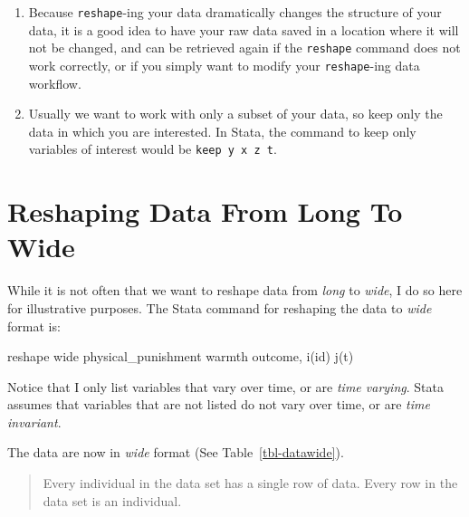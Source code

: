 \documentclass[
  letterpaper,
  DIV=11,
  numbers=noendperiod]{scrreprt}
\newenvironment{Shaded}{\begin{snugshade}}{\end{snugshade}}
\newcommand{\KeywordTok}[1]{\textcolor[rgb]{0.00,0.23,0.31}{#1}}
\newcommand{\NormalTok}[1]{\textcolor[rgb]{0.00,0.23,0.31}{#1}}
\providecommand{\tightlist}{%
  \setlength{\itemsep}{0pt}\setlength{\parskip}{0pt}}\usepackage{longtable,booktabs,array}
\begin{document}
\begin{enumerate}
\def\labelenumi{\arabic{enumi}.}
\tightlist
\item
  Because \texttt{reshape}-ing your data dramatically changes the
  structure of your data, it is a good idea to have your raw data saved
  in a location where it will not be changed, and can be retrieved again
  if the \texttt{reshape} command does not work correctly, or if you
  simply want to modify your \texttt{reshape}-ing data workflow.
\item
  Usually we want to work with only a subset of your data, so keep only
  the data in which you are interested. In Stata, the command to keep
  only variables of interest would be \texttt{keep\ y\ x\ z\ t}.
\end{enumerate}

\section{Reshaping Data From Long To
Wide}\label{reshaping-data-from-long-to-wide}

While it is not often that we want to reshape data from \emph{long} to
\emph{wide}, I do so here for illustrative purposes. The Stata command
for reshaping the data to \emph{wide} format is:

\begin{Shaded}
\begin{Highlighting}[]

\KeywordTok{reshape} \KeywordTok{wide}\NormalTok{ physical\_punishment warmth outcome, i(id) j(t)}
\end{Highlighting}
\end{Shaded}

Notice that I only list variables that vary over time, or are \emph{time
varying}. Stata assumes that variables that are not listed do not vary
over time, or are \emph{time invariant}.

The data are now in \emph{wide} format (See Table~\ref{tbl-datawide}).

\begin{quote}
Every individual in the data set has a single row of data. Every row in
the data set is an individual.
\end{quote}
\end{document}
